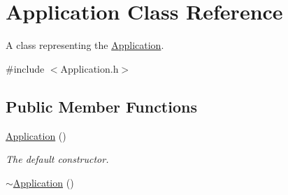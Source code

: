 \hypertarget{class_application}{\section{Application Class Reference}
\label{class_application}
}


A class representing the \hyperlink{class_application}{Application}.  




{\ttfamily \#include $<$Application.\+h$>$}

\subsection*{Public Member Functions}
\begin{DoxyCompactItemize}
\item 
\hypertarget{class_application_afa8cc05ce6b6092be5ecdfdae44e05f8}{\hyperlink{class_application_afa8cc05ce6b6092be5ecdfdae44e05f8}{Application} ()}\label{class_application_afa8cc05ce6b6092be5ecdfdae44e05f8}

\begin{DoxyCompactList}\small\item\em The default constructor. \end{DoxyCompactList}\item 
\hypertarget{class_application_a748bca84fefb9c12661cfaa2f623748d}{\hyperlink{class_application_a748bca84fefb9c12661cfaa2f623748d}{$\sim$\+Application} ()}\label{class_application_a748bca84fefb9c12661cfaa2f623748d}


\end{DoxyCompactItemize}
